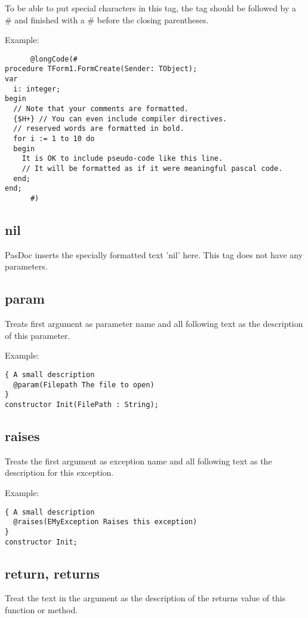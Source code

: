 \documentclass[11pt]{article}
\begin{document}
To be able to put special characters in this tag, the
tag should be followed by a \# and finished with a \# before
the closing parentheses.

Example:
\begin{verbatim}
      @longCode(#
procedure TForm1.FormCreate(Sender: TObject);
var
  i: integer;
begin
  // Note that your comments are formatted.
  {$H+} // You can even include compiler directives.
  // reserved words are formatted in bold.
  for i := 1 to 10 do
  begin
    It is OK to include pseudo-code like this line.
    // It will be formatted as if it were meaningful pascal code.
  end;
end;
      #)
\end{verbatim}      


\subsection{nil}

PasDoc inserts the specially formatted text 'nil' here. This tag does 
not have any parameters.

\subsection{param}

Treats first argument as parameter name and all following text as the 
description of this parameter. 

Example:
\begin{verbatim}
{ A small description 
  @param(Filepath The file to open)
}  
constructor Init(FilePath : String);
\end{verbatim}   


\subsection{raises} 

Treats the first argument as exception name and all following
text as the description for this exception. 

Example:
\begin{verbatim}
{ A small description 
  @raises(EMyException Raises this exception)
}  
constructor Init;
\end{verbatim}

\subsection{return, returns}

Treat the text in the argument as the description of the returns
value of this function or method. 
\end{document}
